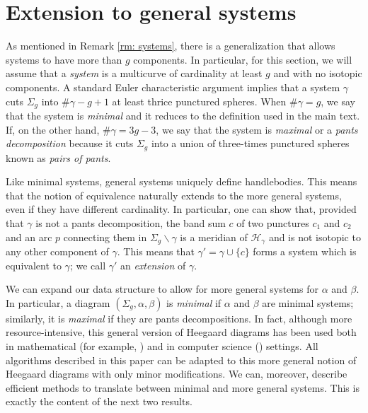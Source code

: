 \documentclass[11pt]{amsart}
\numberwithin{equation}{section}
\theoremstyle{plain}
\theoremstyle{definition}
\begin{document}



\appendix

\section{Extension to general systems}\label{app: extensions}
As mentioned in Remark \ref{rm: systems}, there is a generalization that allows systems to have more than $g$ components. 
In particular, for this section, we will assume that a \emph{system} is a multicurve of cardinality at least $g$ and with no isotopic components.
A standard Euler characteristic argument \cite{schleimer2006notes} implies that a system $\gamma$ cuts $\Sigma_g$ into $\#\gamma-g+1$ at least thrice punctured spheres.
When $\#\gamma=g$, we say that the system is \emph{minimal} and it reduces to the definition used in the main text. 
If, on the other hand, $\#\gamma = 3g-3$, we say that the system is \emph{maximal} or a \emph{pants decomposition} because it cuts $\Sigma_g$ into a union of three-times punctured spheres known as \emph{pairs of pants}. 

Like minimal systems, general systems uniquely define handlebodies. 
This means that the notion of equivalence naturally extends to the more general systems, even if they have different cardinality. 
In particular, one \cite{ennes2025hardnesscomputationquantuminvariants, johnson2006notes} can show that, provided that $\gamma$ is not a pants decomposition, the band sum $c$ of two punctures $c_1$ and $c_2$ and an arc $p$ connecting them in $\Sigma_g\backslash \gamma$ is a meridian of $\mathcal{H}_\gamma$ and is not isotopic to any other component of $\gamma$. 
This means that $\gamma'=\gamma\cup\{c\}$ forms a system which is equivalent to $\gamma$; we call $\gamma'$ an \emph{extension} of $\gamma$.

We can expand our data structure to allow for more general systems for $\alpha$ and $\beta$. 
In particular, a diagram $(\Sigma_g,\alpha,\beta)$ is \emph{minimal} if $\alpha$ and $\beta$ are minimal systems; similarly, it is \emph{maximal} if they are pants decompositions. 
In fact, although more resource-intensive, this general version of Heegaard diagrams has been used both in mathematical (for example, \cite{hempel20013, yoshizawa2014high}) and in computer science (\cite{ennes2025hardnesscomputationquantuminvariants}) settings.
All algorithms described in this paper can be adapted to this more general notion of Heegaard diagrams with only minor modifications.
We can, moreover, describe efficient methods to translate between minimal and more general systems.
This is exactly the content of the next two results. 
\end{document}
